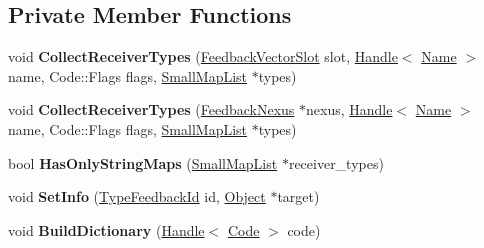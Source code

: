 \subsection*{Private Member Functions}
\begin{DoxyCompactItemize}
\item 
void {\bfseries Collect\+Receiver\+Types} (\hyperlink{classv8_1_1internal_1_1_feedback_vector_slot}{Feedback\+Vector\+Slot} slot, \hyperlink{classv8_1_1internal_1_1_handle}{Handle}$<$ \hyperlink{classv8_1_1internal_1_1_name}{Name} $>$ name, Code\+::\+Flags flags, \hyperlink{classv8_1_1internal_1_1_small_map_list}{Small\+Map\+List} $\ast$types)\hypertarget{classv8_1_1internal_1_1_type_feedback_oracle_ada374e74591e90d36b5a9d49f50e73cb}{}\label{classv8_1_1internal_1_1_type_feedback_oracle_ada374e74591e90d36b5a9d49f50e73cb}

\item 
void {\bfseries Collect\+Receiver\+Types} (\hyperlink{classv8_1_1internal_1_1_feedback_nexus}{Feedback\+Nexus} $\ast$nexus, \hyperlink{classv8_1_1internal_1_1_handle}{Handle}$<$ \hyperlink{classv8_1_1internal_1_1_name}{Name} $>$ name, Code\+::\+Flags flags, \hyperlink{classv8_1_1internal_1_1_small_map_list}{Small\+Map\+List} $\ast$types)\hypertarget{classv8_1_1internal_1_1_type_feedback_oracle_a8a7d1822fe6dcc7ee35e8cc191215dfb}{}\label{classv8_1_1internal_1_1_type_feedback_oracle_a8a7d1822fe6dcc7ee35e8cc191215dfb}

\item 
bool {\bfseries Has\+Only\+String\+Maps} (\hyperlink{classv8_1_1internal_1_1_small_map_list}{Small\+Map\+List} $\ast$receiver\+\_\+types)\hypertarget{classv8_1_1internal_1_1_type_feedback_oracle_a5a339bdeb2b7ed97a18c0d0fb032578c}{}\label{classv8_1_1internal_1_1_type_feedback_oracle_a5a339bdeb2b7ed97a18c0d0fb032578c}

\item 
void {\bfseries Set\+Info} (\hyperlink{classv8_1_1internal_1_1_type_feedback_id}{Type\+Feedback\+Id} id, \hyperlink{classv8_1_1internal_1_1_object}{Object} $\ast$target)\hypertarget{classv8_1_1internal_1_1_type_feedback_oracle_a9d4347b54c3109f6daafff8a53db3263}{}\label{classv8_1_1internal_1_1_type_feedback_oracle_a9d4347b54c3109f6daafff8a53db3263}

\item 
void {\bfseries Build\+Dictionary} (\hyperlink{classv8_1_1internal_1_1_handle}{Handle}$<$ \hyperlink{classv8_1_1internal_1_1_code}{Code} $>$ code)\hypertarget{classv8_1_1internal_1_1_type_feedback_oracle_a51291e5061252690866f3e067a0dc2db}{}\label{classv8_1_1internal_1_1_type_feedback_oracle_a51291e5061252690866f3e067a0dc2db}


\end{DoxyCompactItemize}
